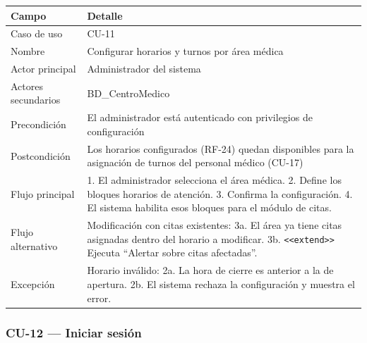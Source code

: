 \documentclass[11pt,a4paper]{article}
\begin{document}
	\begin{longtable}{p{} p{} }
		
		
		\toprule
		\textbf{Campo} &
		\textbf{Detalle}  \\
		\midrule
		\endhead
		
		Caso de uso & CU-11 \\
		Nombre & Configurar horarios y turnos por área médica \\
		Actor principal & Administrador del sistema \\
		Actores secundarios & BD\_CentroMedico \\
		Precondición & El administrador está autenticado con privilegios de configuración \\
		Postcondición & Los horarios configurados (RF-24) quedan disponibles para la asignación de turnos del personal médico (CU-17) \\
		Flujo principal & 1. El administrador selecciona el área médica. 2. Define los bloques horarios de atención. 3. Confirma la configuración. 4. El sistema habilita esos bloques para el módulo de citas. \\
		Flujo alternativo & Modificación con citas existentes: 3a. El área ya tiene citas asignadas dentro del horario a modificar. 3b. \texttt{<<extend>>} Ejecuta ``Alertar sobre citas afectadas''. \\
		Excepción & Horario inválido: 2a. La hora de cierre es anterior a la de apertura. 2b. El sistema rechaza la configuración y muestra el error. \\
		\bottomrule
		
	\end{longtable}
	
	\subsubsection{CU-12 --- Iniciar sesión}
	
\end{document}
